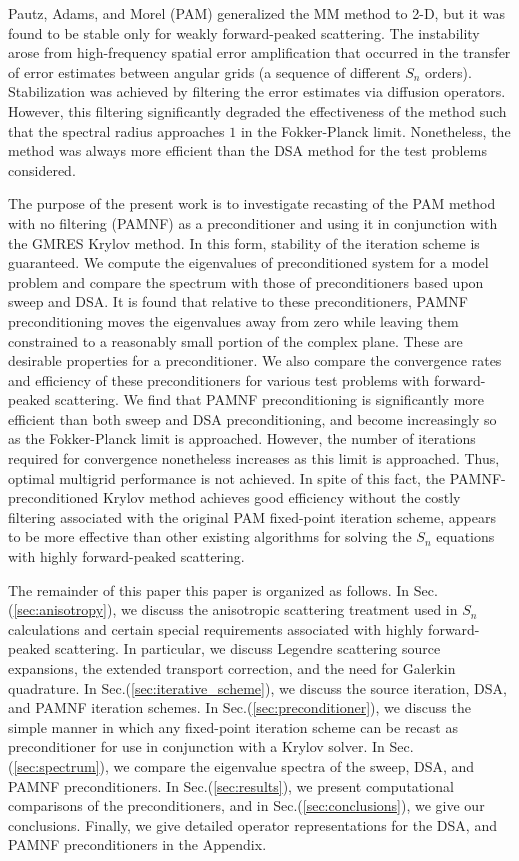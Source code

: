 \documentclass[preprint,10pt]{elsarticle}
\renewcommand{\(}{\left(}
\renewcommand{\)}{\right)}
\renewcommand{\[}{\left[}
\renewcommand{\]}{\right]}
\begin{document}
Pautz, Adams, and Morel (PAM) \cite{multigrid_2d} generalized the MM method to
2-D, but it was found to be stable only for weakly forward-peaked scattering.
The instability arose from high-frequency spatial error amplification that
occurred in the transfer of error estimates between angular grids (a sequence
of different $S_n$ orders). Stabilization was achieved by filtering the error
estimates via diffusion operators. However, this filtering 
significantly degraded the effectiveness of the method such that the spectral
radius approaches $1$ in the Fokker-Planck limit. Nonetheless, the method was 
always more efficient than the DSA method for the test problems considered.

The purpose of the present work is to investigate recasting of the PAM method
with no filtering (PAMNF) as a preconditioner and using it in conjunction with
the GMRES Krylov method. In this form, stability of the iteration scheme is
guaranteed. We compute the eigenvalues of preconditioned system for a model
problem and compare the spectrum with those of preconditioners based upon
sweep and DSA. It is found that relative to these preconditioners,
PAMNF preconditioning moves the eigenvalues away from zero while leaving them
constrained to a reasonably small portion of the complex plane. These are
desirable properties for a preconditioner. We also compare the convergence
rates and efficiency of these preconditioners for various test problems with
forward-peaked scattering. We find that PAMNF preconditioning
is significantly more efficient than both sweep and DSA
preconditioning, and become increasingly so as the Fokker-Planck limit is
approached. However, the number of iterations required for convergence
nonetheless increases as this limit is approached. Thus, optimal multigrid
performance is not achieved. In spite of this fact, the PAMNF-preconditioned
Krylov method achieves good efficiency without the costly filtering associated
with the original PAM fixed-point iteration scheme, appears to be more
effective than other existing algorithms for solving the $S_n$ equations with
highly forward-peaked scattering.

The remainder of this paper this paper is organized as follows. In
Sec.(\ref{sec:anisotropy}), we
discuss the anisotropic scattering treatment used in $S_n$ calculations and
certain special requirements associated with highly forward-peaked scattering.
In particular, we discuss Legendre scattering source expansions, the extended
transport correction, and the need for Galerkin quadrature. In
Sec.(\ref{sec:iterative_scheme}), we
discuss the source iteration, DSA, and PAMNF iteration schemes. In
Sec.(\ref{sec:preconditioner}), we
discuss the simple manner in which any fixed-point iteration scheme can be
recast as preconditioner for use in conjunction with a Krylov solver. In
Sec.(\ref{sec:spectrum}),
we compare the eigenvalue spectra of the sweep, DSA, and PAMNF
preconditioners. In Sec.(\ref{sec:results}), we present computational comparisons of the
preconditioners, and in Sec.(\ref{sec:conclusions}), we give our conclusions. Finally, we give
detailed operator representations for the DSA, and PAMNF
preconditioners in the Appendix.
\end{document}
